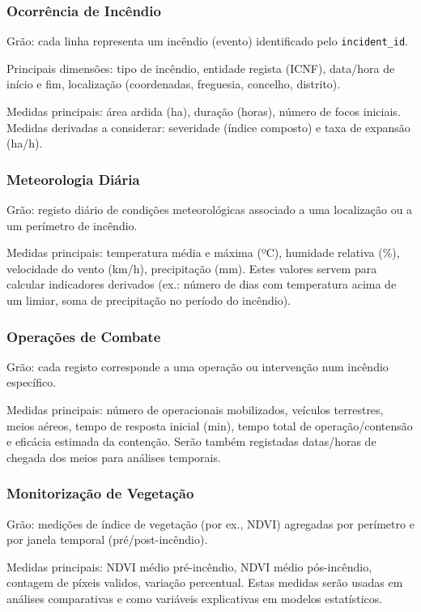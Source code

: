 \subsubsection{Ocorrência de Incêndio}
Grão: cada linha representa um incêndio (evento) identificado pelo \texttt{incident\_id}.

Principais dimensões: tipo de incêndio, entidade regista (ICNF), data/hora de início e fim, localização (coordenadas, freguesia, concelho, distrito).

Medidas principais: área ardida (ha), duração (horas), número de focos iniciais. Medidas derivadas a considerar: severidade (índice composto) e taxa de expansão (ha/h).

\subsubsection{Meteorologia Diária}
Grão: registo diário de condições meteorológicas associado a uma localização ou a um perímetro de incêndio.

Medidas principais: temperatura média e máxima (ºC), humidade relativa (\%), velocidade do vento (km/h), precipitação (mm). Estes valores servem para calcular indicadores derivados (ex.: número de dias com temperatura acima de um limiar, soma de precipitação no período do incêndio).

\subsubsection{Operações de Combate}
Grão: cada registo corresponde a uma operação ou intervenção num incêndio específico.

Medidas principais: número de operacionais mobilizados, veículos terrestres, meios aéreos, tempo de resposta inicial (min), tempo total de operação/contensão e eficácia estimada da contenção. Serão também registadas datas/horas de chegada dos meios para análises temporais.

\subsubsection{Monitorização de Vegetação}
Grão: medições de índice de vegetação (por ex., NDVI) agregadas por perímetro e por janela temporal (pré/post-incêndio).

Medidas principais: NDVI médio pré-incêndio, NDVI médio pós-incêndio, contagem de píxeis validos, variação percentual. Estas medidas serão usadas em análises comparativas e como variáveis explicativas em modelos estatísticos.

